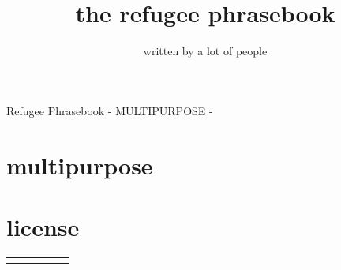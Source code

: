 \documentclass[ %
	11pt, %
	paper=a4,
	landscape,
	abstract=on,
	version=last]{scrartcl}
\author{written by a lot of people}
\title{the refugee phrasebook}
\begin{document}
{\Large Refugee Phrasebook - MULTIPURPOSE - }
\section*{multipurpose}



\section*{license}
 \newline


\begin{longtabu}{X[l] X[l] X[l] X[l]  X[l]}
\everyrow {\tabucline[ on 1 pt ] - }
\toprule

\midrule
\endhead

\end{longtabu}
\end{document}
